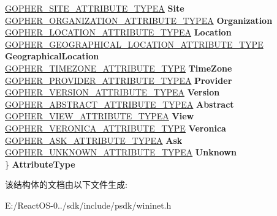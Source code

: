 \begin{DoxyCompactItemize}
\begin{tabbing}
\>\hyperlink{struct_g_o_p_h_e_r___s_i_t_e___a_t_t_r_i_b_u_t_e___t_y_p_e_a}{GOPHER\_SITE\_ATTRIBUTE\_TYPEA} {\bfseries Site}\\
\>\hyperlink{struct_g_o_p_h_e_r___o_r_g_a_n_i_z_a_t_i_o_n___a_t_t_r_i_b_u_t_e___t_y_p_e_a}{GOPHER\_ORGANIZATION\_ATTRIBUTE\_TYPEA} {\bfseries Organization}\\
\>\hyperlink{struct_g_o_p_h_e_r___l_o_c_a_t_i_o_n___a_t_t_r_i_b_u_t_e___t_y_p_e_a}{GOPHER\_LOCATION\_ATTRIBUTE\_TYPEA} {\bfseries Location}\\
\>\hyperlink{struct_g_o_p_h_e_r___g_e_o_g_r_a_p_h_i_c_a_l___l_o_c_a_t_i_o_n___a_t_t_r_i_b_u_t_e___t_y_p_e}{GOPHER\_GEOGRAPHICAL\_LOCATION\_ATTRIBUTE\_TYPE} {\bfseries GeographicalLocation}\\
\>\hyperlink{struct_g_o_p_h_e_r___t_i_m_e_z_o_n_e___a_t_t_r_i_b_u_t_e___t_y_p_e}{GOPHER\_TIMEZONE\_ATTRIBUTE\_TYPE} {\bfseries TimeZone}\\
\>\hyperlink{struct_g_o_p_h_e_r___p_r_o_v_i_d_e_r___a_t_t_r_i_b_u_t_e___t_y_p_e_a}{GOPHER\_PROVIDER\_ATTRIBUTE\_TYPEA} {\bfseries Provider}\\
\>\hyperlink{struct_g_o_p_h_e_r___v_e_r_s_i_o_n___a_t_t_r_i_b_u_t_e___t_y_p_e_a}{GOPHER\_VERSION\_ATTRIBUTE\_TYPEA} {\bfseries Version}\\
\>\hyperlink{struct_g_o_p_h_e_r___a_b_s_t_r_a_c_t___a_t_t_r_i_b_u_t_e___t_y_p_e_a}{GOPHER\_ABSTRACT\_ATTRIBUTE\_TYPEA} {\bfseries Abstract}\\
\>\hyperlink{struct_g_o_p_h_e_r___v_i_e_w___a_t_t_r_i_b_u_t_e___t_y_p_e_a}{GOPHER\_VIEW\_ATTRIBUTE\_TYPEA} {\bfseries View}\\
\>\hyperlink{struct_g_o_p_h_e_r___v_e_r_o_n_i_c_a___a_t_t_r_i_b_u_t_e___t_y_p_e}{GOPHER\_VERONICA\_ATTRIBUTE\_TYPE} {\bfseries Veronica}\\
\>\hyperlink{struct_g_o_p_h_e_r___a_s_k___a_t_t_r_i_b_u_t_e___t_y_p_e_a}{GOPHER\_ASK\_ATTRIBUTE\_TYPEA} {\bfseries Ask}\\
\>\hyperlink{struct_g_o_p_h_e_r___u_n_k_n_o_w_n___a_t_t_r_i_b_u_t_e___t_y_p_e_a}{GOPHER\_UNKNOWN\_ATTRIBUTE\_TYPEA} {\bfseries Unknown}\\
\} {\bfseries AttributeType}\\

\end{tabbing}\end{DoxyCompactItemize}


该结构体的文档由以下文件生成\+:\begin{DoxyCompactItemize}
\item 
E\+:/\+React\+O\+S-\/0../sdk/include/psdk/wininet.\+h\end{DoxyCompactItemize}
